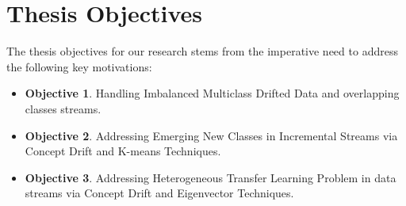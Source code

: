 \section{Thesis Objectives}
\label{sec:1_introduction_objectives}
The thesis objectives for our research stems from the imperative need to address the following key motivations:
\begin{itemize}
    \setlength{\itemsep}{0pt}
    \setlength{\parskip}{0pt}
    \item \textbf{Objective 1}. Handling Imbalanced Multiclass Drifted Data and overlapping classes streams.
    \item \textbf{Objective 2}. Addressing Emerging New Classes in Incremental Streams via Concept Drift and K-means Techniques.
    \item \textbf{Objective 3}. Addressing Heterogeneous Transfer Learning Problem in data streams via Concept Drift and Eigenvector Techniques.
\end{itemize}
